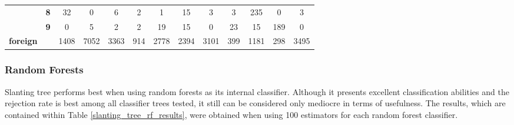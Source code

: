 \begin{table}[htp]
{\begin{tabular}{|c|c|c|c|c|c|c|c|c|c|c|c|c|}
		& \textbf{8} & 32         & 0          & 6          & 2          & 1          & 15         & 3          & 3          & 235        & 0          & 3                \\ \cline{2-13} 
		& \textbf{9} & 0          & 5          & 2          & 2          & 19         & 15         & 0          & 23         & 15         & 189        & 0                \\ \hline
		\textbf{foreign}                    & \textbf{}  & 1408       & 7052       & 3363       & 914        & 2778       & 2394       & 3101       & 399        & 1181       & 298        & 3495             \\ \hline
	\end{tabular}
}
\end{table}

\subsubsection{Random Forests}

Slanting tree performs best when using random forests as its internal classifier. Although it presents excellent classification abilities and the rejection rate is best among all classifier trees tested, it still can be considered only mediocre in terms of usefulness. The results, which are contained within Table \ref{slanting_tree_rf_results}, were obtained when using 100 estimators for each random forest classifier.

